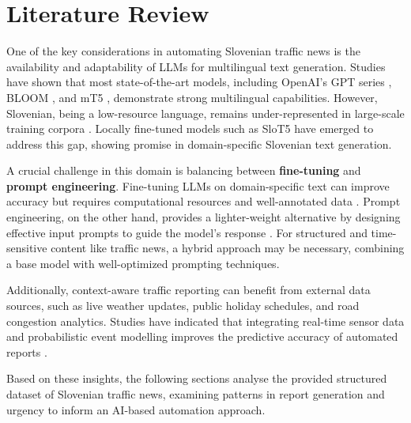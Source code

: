 \section*{Literature Review} 
One of the key considerations in automating Slovenian traffic news is the availability and adaptability of LLMs for multilingual text generation. Studies have shown that most state-of-the-art models, including OpenAI’s GPT series \cite{brown2020language}, BLOOM \cite{scao2022bloom}, and mT5 \cite{xue2021mt5}, demonstrate strong multilingual capabilities. However, Slovenian, being a low-resource language, remains under-represented in large-scale training corpora \cite{ulcar2021sloberta}. Locally fine-tuned models such as SloT5 \cite{ulcar2022slot5} have emerged to address this gap, showing promise in domain-specific Slovenian text generation.

A crucial challenge in this domain is balancing between \textbf{fine-tuning} and \textbf{prompt engineering}. Fine-tuning LLMs on domain-specific text can improve accuracy but requires computational resources and well-annotated data \cite{zhang2022fine}. Prompt engineering, on the other hand, provides a lighter-weight alternative by designing effective input prompts to guide the model’s response \cite{reynolds2021prompt}. For structured and time-sensitive content like traffic news, a hybrid approach may be necessary, combining a base model with well-optimized prompting techniques.

Additionally, context-aware traffic reporting can benefit from external data sources, such as live weather updates, public holiday schedules, and road congestion analytics. Studies have indicated that integrating real-time sensor data and probabilistic event modelling improves the predictive accuracy of automated reports \cite{schelter2019automated}.

Based on these insights, the following sections analyse the provided structured dataset of Slovenian traffic news, examining patterns in report generation and urgency to inform an AI-based automation approach.
